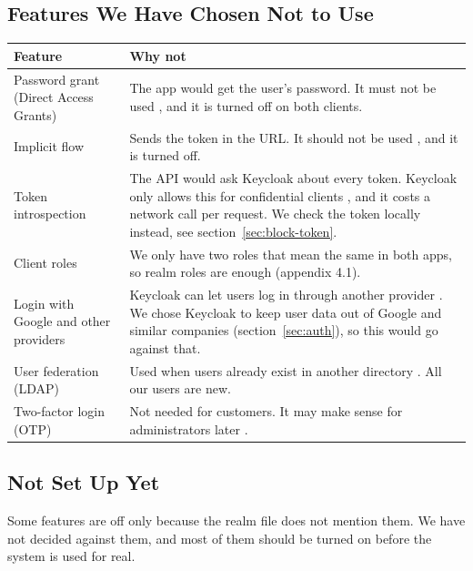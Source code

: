 \documentclass[a4paper,11pt]{article}
\begin{document}
\subsection{Features We Have Chosen Not to Use}
\begin{center}
\begin{tabular}{@{}p{4cm} p{10.4cm}@{}}
\textbf{Feature} & \textbf{Why not} \\
\hline
Password grant (Direct Access Grants) & The app would get the user's password. It must not be used \cite[sec.~2.4]{ietf-rfc9700-oauth-security-bcp}, and it is turned off on both clients. \\
\hline
Implicit flow & Sends the token in the URL. It should not be used \cite[sec.~2.1.2]{ietf-rfc9700-oauth-security-bcp}, and it is turned off. \\
\hline
Token introspection & The API would ask Keycloak about every token. Keycloak only allows this for confidential clients \cite[sec.~Introspection endpoint]{keycloak-securing-apps-oidc}, and it costs a network call per request. We check the token locally instead, see section~\ref{sec:block-token}. \\
\hline
Client roles & We only have two roles that mean the same in both apps, so realm roles are enough (appendix 4.1). \\
\hline
Login with Google and other providers & Keycloak can let users log in through another provider \cite[sec.~Social Identity Providers]{keycloak-server-admin-guide}. We chose Keycloak to keep user data out of Google and similar companies (section~\ref{sec:auth}), so this would go against that. \\
\hline
User federation (LDAP) & Used when users already exist in another directory \cite[sec.~Lightweight Directory Access Protocol (LDAP) and Active Directory]{keycloak-server-admin-guide}. All our users are new. \\
\hline
Two-factor login (OTP) & Not needed for customers. It may make sense for administrators later \cite[sec.~One Time Password (OTP) policies]{keycloak-server-admin-guide}. \\
\hline
\end{tabular}
\end{center}

\subsection{Not Set Up Yet}
Some features are off only because the realm file does not mention them. We have not decided against them, and most of them should be turned on before the system is used for real.
\end{document}

